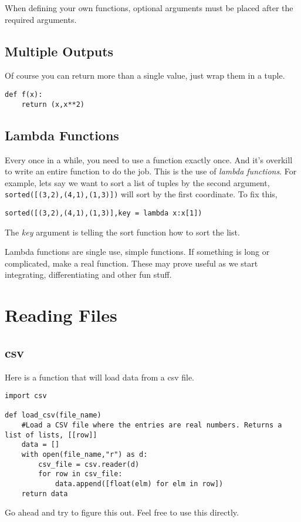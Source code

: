 \documentclass[11pt,letterpaper]{article}
\begin{document}
When defining your own functions, optional arguments must be placed after the required arguments. 

\subsection{Multiple Outputs}
Of course you can return more than a single value, just wrap them in a tuple.
\begin{verbatim}
def f(x):
    return (x,x**2)
\end{verbatim}

\subsection{Lambda Functions}
Every once in a while, you need to use a function exactly once. And it's overkill to write an entire
function to do the job. This is the use of \emph{lambda functions}. For example, lets say we 
want to sort a list of tuples by the second argument, \texttt{sorted([(3,2),(4,1),(1,3)])} will
sort by the first coordinate. To fix this,
\begin{verbatim}
sorted([(3,2),(4,1),(1,3)],key = lambda x:x[1])
\end{verbatim}
The \emph{key} argument is telling the sort function how to sort the list. 

Lambda functions are single use, simple functions. If something is long or complicated, make a real
function. These may prove useful as we start integrating, differentiating and other fun stuff.









\section{Reading Files}


\subsection{csv}
Here is a function that will load data from a csv file. 
\begin{verbatim}
import csv

def load_csv(file_name)
    #Load a CSV file where the entries are real numbers. Returns a list of lists, [[row]]
    data = []
    with open(file_name,"r") as d:
        csv_file = csv.reader(d)
        for row in csv_file:
            data.append([float(elm) for elm in row])
    return data
\end{verbatim}
Go ahead and try to figure this out. Feel free to use this directly.
\end{document}

